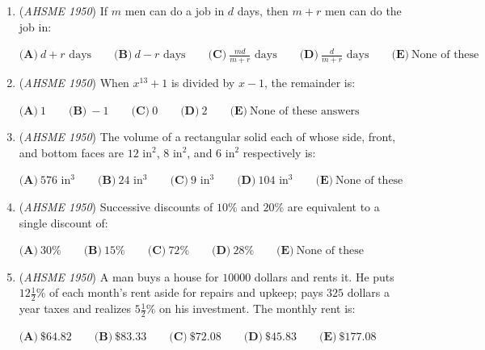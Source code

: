 \begin{enumerate}
 (4) $\frac{\log x}{\log y}=\log{x}-\log{y}$


 (5) $a(xy)=ax \cdot ay$
$\textbf{(A)}\ \text{Only 1 and 4 are true}\qquad\\\textbf{(B)}\ \text{Only 1 and 5 are true}\qquad\\\textbf{(C)}\ \text{Only 1 and 3 are true}\qquad\\\textbf{(D)}\ \text{Only 1 and 2 are true}\qquad\\\textbf{(E)}\ \text{Only 1 is true}$


	\item (\textit{AHSME 1950}) If $m$ men can do a job in $d$ days, then $m+r$ men can do the job in:


 $\textbf{(A)}\ d+r\text{ days}\qquad\textbf{(B)}\ d-r\text{ days}\qquad\textbf{(C)}\ \frac{md}{m+r}\text{ days}\qquad\textbf{(D)}\ \frac{d}{m+r}\text{ days}\qquad\textbf{(E)}\ \text{None of these}$


	\item (\textit{AHSME 1950}) When $x^{13}+1$ is divided by $x-1$, the remainder is:


 $\textbf{(A)}\ 1\qquad\textbf{(B)}\ -1\qquad\textbf{(C)}\ 0\qquad\textbf{(D)}\ 2\qquad\textbf{(E)}\ \text{None of these answers}$


	\item (\textit{AHSME 1950}) The volume of a rectangular solid each of whose side, front, and bottom faces are $12\text{ in}^{2}$, $8\text{ in}^{2}$, and $6\text{ in}^{2}$ respectively is:


 $\textbf{(A)}\ 576\text{ in}^{3}\qquad\textbf{(B)}\ 24\text{ in}^{3}\qquad\textbf{(C)}\ 9\text{ in}^{3}\qquad\textbf{(D)}\ 104\text{ in}^{3}\qquad\textbf{(E)}\ \text{None of these}$


	\item (\textit{AHSME 1950}) Successive discounts of $10\%$ and $20\%$ are equivalent to a single discount of:


 $\textbf{(A)}\ 30\%\qquad\textbf{(B)}\ 15\%\qquad\textbf{(C)}\ 72\%\qquad\textbf{(D)}\ 28\%\qquad\textbf{(E)}\ \text{None of these}$


	\item (\textit{AHSME 1950}) A man buys a house for $10000$ dollars and rents it. He puts $12\frac{1}{2}\%$ of each month's rent aside for repairs and upkeep; pays $325$ dollars a year taxes and realizes $5\frac{1}{2}\%$ on his investment. The monthly rent is:


 $\textbf{(A)}\ \$64.82 \qquad\textbf{(B)}\ \$83.33 \qquad\textbf{(C)}\ \$72.08\qquad\textbf{(D)}\ \$45.83 \qquad\textbf{(E)}\ \$177.08$



\end{enumerate}
